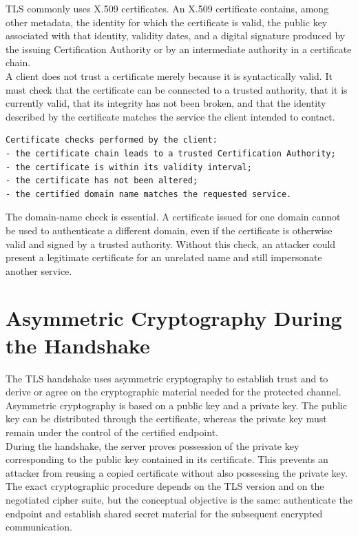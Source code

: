 \documentclass{scrbook}
\begin{document}
TLS commonly uses X.509 certificates. An X.509 certificate contains, among other metadata, the identity for which the certificate is valid, the public key associated with that identity, validity dates, and a digital signature produced by the issuing Certification Authority or by an intermediate authority in a certificate chain.\\

A client does not trust a certificate merely because it is syntactically valid. It must check that the certificate can be connected to a trusted authority, that it is currently valid, that its integrity has not been broken, and that the identity described by the certificate matches the service the client intended to contact.

\begin{lstlisting}
Certificate checks performed by the client:
- the certificate chain leads to a trusted Certification Authority;
- the certificate is within its validity interval;
- the certificate has not been altered;
- the certified domain name matches the requested service.
\end{lstlisting}

The domain-name check is essential. A certificate issued for one domain cannot be used to authenticate a different domain, even if the certificate is otherwise valid and signed by a trusted authority. Without this check, an attacker could present a legitimate certificate for an unrelated name and still impersonate another service.

\section{Asymmetric Cryptography During the Handshake}

The TLS handshake uses asymmetric cryptography to establish trust and to derive or agree on the cryptographic material needed for the protected channel. Asymmetric cryptography is based on a public key and a private key. The public key can be distributed through the certificate, whereas the private key must remain under the control of the certified endpoint.\\

During the handshake, the server proves possession of the private key corresponding to the public key contained in its certificate. This prevents an attacker from reusing a copied certificate without also possessing the private key. The exact cryptographic procedure depends on the TLS version and on the negotiated cipher suite, but the conceptual objective is the same: authenticate the endpoint and establish shared secret material for the subsequent encrypted communication.\\
\end{document}

